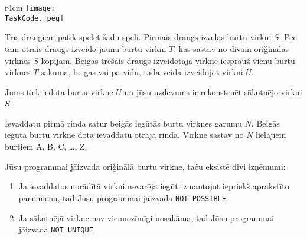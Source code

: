 \documentclass{boi2014-lv}
\renewcommand{\TaskCode}{friends}
\begin{document}
    \begin{wrapfigure}{r}{4cm}
        \vspace{-24pt}
		\texttt{[image: \\TaskCode.jpeg]}
	\end{wrapfigure}
		Trīs draugiem patīk spēlēt šādu spēli.
		Pirmais draugs izvēlas burtu virkni $S$. Pēc tam otrais draugs izveido jaunu burtu virkni $T$, kas sastāv no divām ori\v{g}inālās virknes $S$ kopijām. Beigās trešais draugs izveidotajā virknē iesprauž vienu burtu virknes $T$ sākumā, beigās vai pa vidu, tādā veidā izveidojot virkni $U$.

    \Task
    Jums tiek iedota burtu virkne $U$ un jūsu uzdevums ir rekonstruēt sākotnējo virkni $S$.

    \Input
    Ievaddatu pirmā rinda satur beigās iegūtās burtu virknes garumu $N$. Beigās iegūtā burtu virkne dota ievaddatu otrajā rindā. Virkne sastāv no $N$ lielajiem burtiem A, B, C, \ldots{}, Z.

    \Output
		Jūsu programmai jāizvada ori\v{g}inālā burtu virkne, taču eksistē divi izņēmumi:
    \begin{enumerate}
        \item Ja ievaddatos norādītā virkni nevarēja iegūt izmantojot iepriekš aprakstīto paņēmienu, tad Jūsu programmai jāizvada {\tt NOT POSSIBLE}.%
        \item Ja sākotnējā virkne nav viennozīmīgi nosakāma, tad Jūsu programmai jāizvada {\tt NOT UNIQUE}. %
    \end{enumerate}
    

    \Examples

\end{document}
